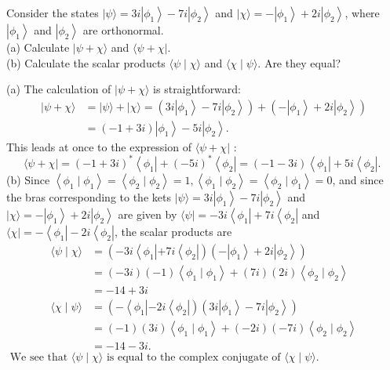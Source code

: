 \begin{exercise}
	Consider the states $|\psi\rangle=3 i\left|\phi_{1}\right\rangle-7 i\left|\phi_{2}\right\rangle$ and $|\chi\rangle=-\left|\phi_{1}\right\rangle+2 i\left|\phi_{2}\right\rangle$, where $\left|\phi_{1}\right\rangle$ and $\left|\phi_{2}\right\rangle$ are orthonormal.\\
	(a) Calculate $|\psi+\chi\rangle$ and $\langle\psi+\chi|$.\\
	(b) Calculate the scalar products $\langle\psi \mid \chi\rangle$ and $\langle\chi \mid \psi\rangle$. Are they equal?
\end{exercise}
\begin{answer}
	(a) The calculation of $|\psi+\chi\rangle$ is straightforward:
	$$
	\begin{aligned}
	|\psi+\chi\rangle &=|\psi\rangle+|\chi\rangle=\left(3 i\left|\phi_{1}\right\rangle-7 i\left|\phi_{2}\right\rangle\right)+\left(-\left|\phi_{1}\right\rangle+2 i\left|\phi_{2}\right\rangle\right) \\
	&=(-1+3 i)\left|\phi_{1}\right\rangle-5 i\left|\phi_{2}\right\rangle .
	\end{aligned}
	$$
	This leads at once to the expression of $\langle\psi+\chi|$ :
	$$
	\langle\psi+\chi|=(-1+3 i)^{*}\left\langle\phi_{1}\right|+(-5 i)^{*}\left\langle\phi_{2}\right|=(-1-3 i)\left\langle\phi_{1}\right|+5 i\left\langle\phi_{2}\right| \text {. }
	$$
	(b) Since $\left\langle\phi_{1} \mid \phi_{1}\right\rangle=\left\langle\phi_{2} \mid \phi_{2}\right\rangle=1,\left\langle\phi_{1} \mid \phi_{2}\right\rangle=\left\langle\phi_{2} \mid \phi_{1}\right\rangle=0$, and since the bras corresponding to the kets $|\psi\rangle=3 i\left|\phi_{1}\right\rangle-7 i\left|\phi_{2}\right\rangle$ and $|\chi\rangle=-\left|\phi_{1}\right\rangle+2 i\left|\phi_{2}\right\rangle$ are given by $\langle\psi|=-3 i\left\langle\phi_{1}\right|+7 i\left\langle\phi_{2}\right|$ and $\langle\chi|=-\left\langle\phi_{1}\right|-2 i\left\langle\phi_{2}\right|$, the scalar products are\\
	$$\begin{aligned}
		\langle\psi \mid \chi\rangle &=\left(-3 i\left\langle\phi_{1}\left|+7 i\left\langle\phi_{2}\right|\right)\left(-\left|\phi_{1}\right\rangle+2 i\left|\phi_{2}\right\rangle\right)\right.\right.\\
		&=(-3 i)(-1)\left\langle\phi_{1} \mid \phi_{1}\right\rangle+(7 i)(2 i)\left\langle\phi_{2} \mid \phi_{2}\right\rangle \\
		&=-14+3 i \\
		\langle\chi \mid \psi\rangle &=\left(-\left\langle\phi_{1}\left|-2 i\left\langle\phi_{2}\right|\right)\left(3 i\left|\phi_{1}\right\rangle-7 i\left|\phi_{2}\right\rangle\right)\right.\right.\\
		&=(-1)(3 i)\left\langle\phi_{1} \mid \phi_{1}\right\rangle+(-2 i)(-7 i)\left\langle\phi_{2} \mid \phi_{2}\right\rangle \\
		&=-14-3 i .
	\end{aligned}$$
	$\text { We see that }\langle\psi \mid \chi\rangle \text { is equal to the complex conjugate of }\langle\chi \mid \psi\rangle \text {. }$
\end{answer}
